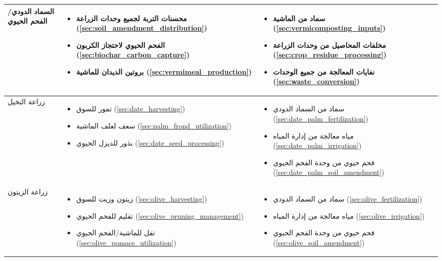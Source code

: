 \begin{table}[h]
\centering
\begin{tabular}{|p{2.5cm}|p{5cm}|p{5cm}|}
\hline
السماد الدودي/الفحم الحيوي & 
\begin{itemize}
    \item محسنات التربة لجميع وحدات الزراعة (\ref{sec:soil_amendment_distribution})
    \item الفحم الحيوي لاحتجاز الكربون (\ref{sec:biochar_carbon_capture})
    \item بروتين الديدان للماشية (\ref{sec:vermimeal_production})
\end{itemize} & 
\begin{itemize}
    \item سماد من الماشية (\ref{sec:vermicomposting_inputs})
    \item مخلفات المحاصيل من وحدات الزراعة (\ref{sec:crop_residue_processing})
    \item نفايات المعالجة من جميع الوحدات (\ref{sec:waste_conversion})
\end{itemize} \\
\hline
زراعة النخيل & 
\begin{itemize}
    \item تمور للسوق (\ref{sec:date_harvesting})
    \item سعف لعلف الماشية (\ref{sec:palm_frond_utilization})
    \item بذور للديزل الحيوي (\ref{sec:date_seed_processing})
\end{itemize} & 
\begin{itemize}
    \item سماد من السماد الدودي (\ref{sec:date_palm_fertilization})
    \item مياه معالجة من إدارة المياه (\ref{sec:date_palm_irrigation})
    \item فحم حيوي من وحدة الفحم الحيوي (\ref{sec:date_palm_soil_amendment})
\end{itemize} \\
\hline
زراعة الزيتون & 
\begin{itemize}
    \item زيتون وزيت للسوق (\ref{sec:olive_harvesting})
    \item تقليم للفحم الحيوي (\ref{sec:olive_pruning_management})
    \item تفل للماشية/الفحم الحيوي (\ref{sec:olive_pomace_utilization})
\end{itemize} & 
\begin{itemize}
    \item سماد من السماد الدودي (\ref{sec:olive_fertilization})
    \item مياه معالجة من إدارة المياه (\ref{sec:olive_irrigation})
    \item فحم حيوي من وحدة الفحم الحيوي (\ref{sec:olive_soil_amendment})
\end{itemize} \\
\hline
\end{tabular}
\end{table}
